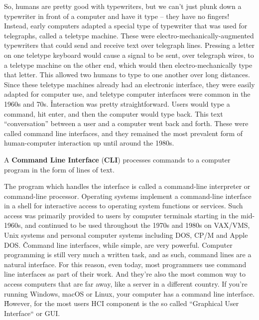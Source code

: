 So, humans are pretty good with typewriters, but we can't just plunk down a typewriter in front of a computer and
have it type – they have no fingers! Instead, early computers adapted a special type of typewriter that was used for
telegraphs, called a teletype machine. These were electro-mechanically-augmented typewriters that could send and
receive text over telegraph lines. Pressing a letter on one teletype keyboard would cause a signal to be sent, over
telegraph wires, to a teletype machine on the other end, which would then electro-mechanically type that letter. This
allowed two humans to type to one another over long distances. Since these teletype machines already had an
electronic interface, they were easily adapted for computer use, and teletype computer interfaces were common in the
1960s and 70s. \v

Interaction was pretty straightforward. Users would type a command, hit enter, and then the computer would type back.
This text ``conversation'' between a user and a computer went back and forth. These were called command line
interfaces, and they remained the most prevalent form of human-computer interaction up until around the 1980s.

A \textbf{Command Line Interface} (\textbf{CLI}) processes commands to a computer program in the form of lines of text.
\ed

The program which handles the interface is called a command-line interpreter or command-line processor. Operating
systems implement a command-line interface in a shell for interactive access to operating system functions or
services. Such access was primarily provided to users by computer terminals starting in the mid-1960s, and continued
to be used throughout the 1970s and 1980s on VAX/VMS, Unix systems and personal computer systems including DOS, CP/M
and Apple DOS. \v

Command line interfaces, while simple, are very powerful. Computer programming is still very much a written task, and
as such, command lines are a natural interface. For this reason, even today, most programmers use command line
interfaces as part of their work. And they're also the most common way to access computers that are far away, like a
server in a different country. If you're running Windows, macOS or Linux, your computer has a command line interface. \v

However, for the most users HCI component is the so called ``Graphical User Interface`` or GUI.

